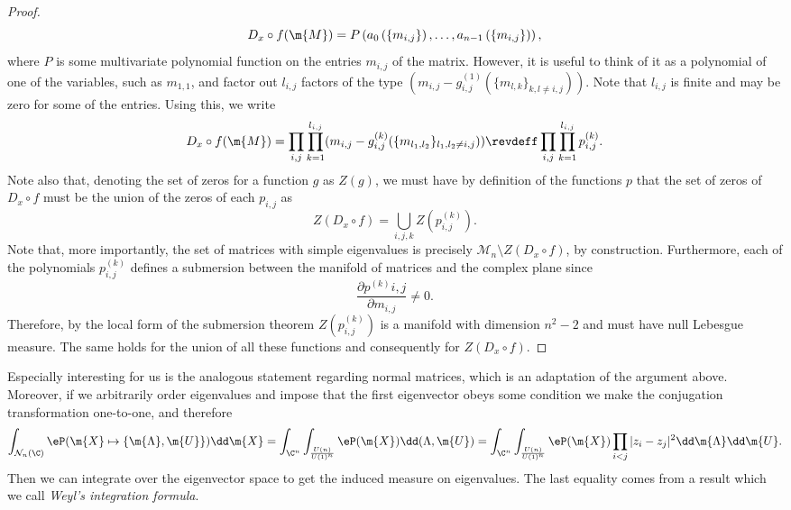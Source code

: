 \begin{proof}
	\begin{equation}
	D_x \circ f(\m{M}) = P\left( a_0\left(\left\{ m_{i,j} \right\}\right) , \dots,  a_{n-1}\left(\left\{ m_{i,j} \right\}\right) \right),
	\end{equation}
	where $P$ is some multivariate polynomial function on the entries $m_{i,j}$ of the matrix. However, it is useful to think of it as a polynomial of one of the variables, such as $m_{1,1}$, and factor out $l_{i,j}$ factors of the type $(m_{i,j} - g_{i,j}^{(1)}(\{m_{l,k}\}_{k,l \neq i,j}))$. Note that $l_{i,j}$ is finite and may be zero for some of the entries. Using this, we write
	\begin{equation}
		D_x \circ f(\m{M}) = \prod_{i,j} \prod_{k = 1}^{l_{i,j}} (m_{i,j} - g_{i,j}^{(k)}(\{m_{l_1,l_2}\}_{l_1,l_2 \neq i,j})) \revdeff \prod_{i,j} \prod_{k = 1}^{l_{i,j}} p^{(k)}_{i,j}.
	\end{equation}
	Note also that, denoting the set of zeros for a function $g$ as $Z(g)$, we must have by definition of the functions $p$ that the set of zeros of $D_x \circ f$ must be the union of the zeros of each $p_{i,j}$ as
	\begin{equation}
		Z(D_x \circ f) =  \bigcup_{i,j,k} Z\left( p^{(k)}_{i,j} \right).
	\end{equation}
	Note that, more importantly, the set of matrices with simple eigenvalues is precisely $\mathcal{M}_n \setminus Z(D_x \circ f)$, by construction. Furthermore, each of the polynomials $p^{(k)}_{i,j}$ defines a submersion between the manifold of matrices and the complex plane since
	\begin{equation}
		\frac{\partial p^{(k)}{i,j}}{\partial m_{i,j}} \neq 0.
	\end{equation}
	Therefore, by the local form of the submersion theorem $Z\left(p^{(k)}_{i,j}\right)$ is a manifold with dimension $n^2 -2$ and must have null Lebesgue measure. The same holds for the union of all these functions and consequently for $Z(D_x \circ f)$.
\end{proof}

Especially interesting for us is the analogous statement regarding normal matrices, which is an adaptation of the argument above. Moreover, if we arbitrarily order eigenvalues and impose that the first eigenvector obeys some condition we make the conjugation transformation one-to-one, and therefore
\begin{equation}
	\int_{\mathcal{N}_n(\C)} \eP(\m{X} \mapsto \{\m{\Lambda}, \m{U}\}) \dd \m{X} = \int_{\C^n} \int_{\frac{U(n)}{U(1)^n}} \eP(\m{X}) \dd(\Lambda, \m{U}) =  \int_{\C^n} \int_{\frac{U(n)}{U(1)^n}} \eP(\m{X}) \prod_{i < j} |z_i - z_j|^2 \dd\m{\Lambda} \dd \m{U}.
\end{equation}
Then we can integrate over the eigenvector space to get the induced measure on eigenvalues. The last equality comes from a result which we call \textit{Weyl's integration formula}. 

